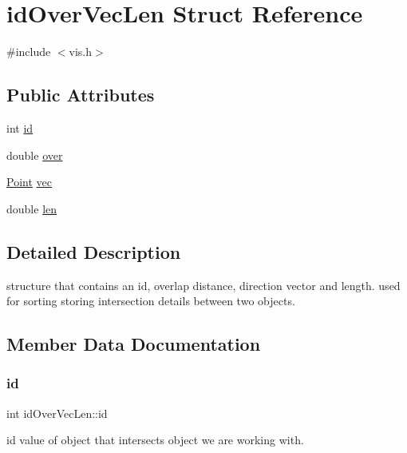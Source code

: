 \hypertarget{structid_over_vec_len}{}\section{id\+Over\+Vec\+Len Struct Reference}
\label{structid_over_vec_len}


{\ttfamily \#include $<$vis.\+h$>$}

\subsection*{Public Attributes}
\begin{DoxyCompactItemize}
\item 
int \mbox{\hyperlink{structid_over_vec_len_ac728d62d94bf608a6f11ce5c0a6485ad}{id}}
\item 
double \mbox{\hyperlink{structid_over_vec_len_a9387d2c3130328e5e24988d759f5a46a}{over}}
\item 
\mbox{\hyperlink{struct_point}{Point}} \mbox{\hyperlink{structid_over_vec_len_a86fea6b0e81e2e4addb46265dd570985}{vec}}
\item 
double \mbox{\hyperlink{structid_over_vec_len_ac78dfd24fef77a3e5a90d2c3c4576548}{len}}
\end{DoxyCompactItemize}


\subsection{Detailed Description}
structure that contains an id, overlap distance, direction vector and length. used for sorting storing intersection details between two objects. 

\subsection{Member Data Documentation}
\mbox{\label{structid_over_vec_len_ac728d62d94bf608a6f11ce5c0a6485ad}} 
\subsubsection{\texorpdfstring{id}{id}}
{\footnotesize\ttfamily int id\+Over\+Vec\+Len\+::id}

id value of object that intersects object we are working with. \mbox{\label{structid_over_vec_len_ac78dfd24fef77a3e5a90d2c3c4576548}} 

